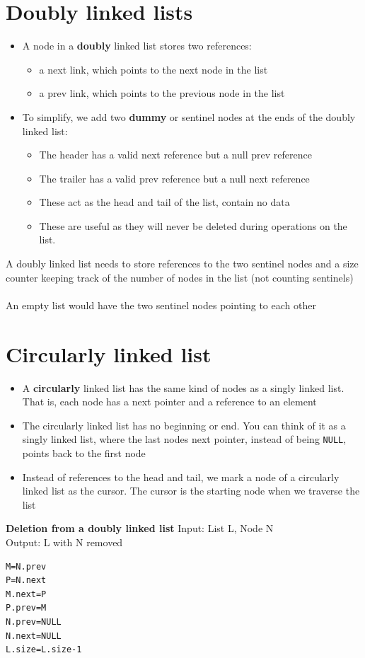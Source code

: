 \documentclass{article}[18pt]
\begin{document}
\section{Doubly linked lists}
\begin{itemize}
\item A node in  a \textbf{doubly} linked list stores two references:
\begin{itemize}
\item a next link, which points to the next node in the list
\item a prev link, which points to the previous node in the list
\end{itemize}

\item To simplify, we add two \textbf{dummy} or sentinel nodes at the ends of the doubly linked list:
\begin{itemize}
\item The header has a valid next reference but a null prev reference
\item The trailer has a valid prev reference but a null next reference
\item These act as the head and tail of the list, contain no data
\item These are useful as they will never be deleted during operations on the list.
\end{itemize}
\end{itemize}

A doubly linked list needs to store references to the two sentinel nodes and a size counter keeping track of the number of nodes in the list (not counting sentinels)\\
\\
An empty list would have the two sentinel nodes pointing to each other
\section{Circularly linked list}
\begin{itemize}
\item A \textbf{circularly} linked list has the same kind of nodes as a singly linked list. That is, each node has a next pointer and a reference to an element
\item The circularly linked list has no beginning or end. You can think of it as a singly linked list, where the last nodes next pointer, instead of being \texttt{NULL}, points back to the first node
\item Instead of references to the head and tail, we mark a node of a circularly linked list as the cursor. The cursor is the starting node when we traverse the list
\end{itemize}
\textbf{Deletion from a doubly linked list}
Input: List L, Node N\\
Output: L with N removed\\
\newpage
\begin{lstlisting}[mathescape=true]
M=N.prev
P=N.next
M.next=P
P.prev=M
N.prev=NULL
N.next=NULL
L.size=L.size-1
\end{lstlisting}
\end{document}
